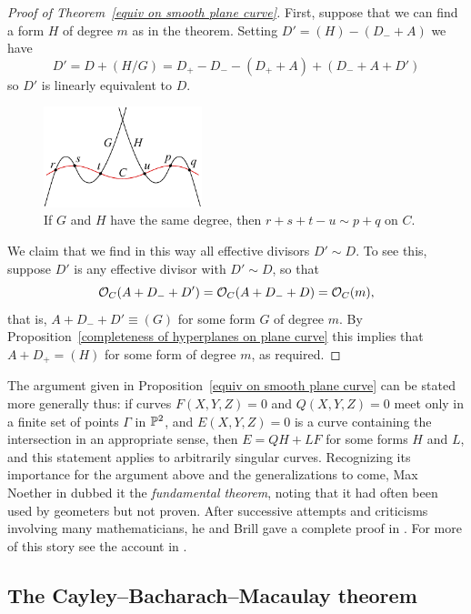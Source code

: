 \begin{proof}[Proof of Theorem~\ref{equiv on smooth plane curve}]
First, suppose that we can find a form $H$ of degree $m$ as in the theorem.
Setting $D' = (H) -(D_{-}+A)$ we have
$$
D' = D + (H/G) = D_{+}- D_{-} - (D_{+}+A)+(D_{-}+A+D')
$$
so $D'$ is linearly equivalent to $D$. 

\begin{figure}
\centerline{\includegraphics[height=1.15in]{"main/Fig14-1"}}
\nointerlineskip
\vskip-15pt
\centerline{\color{white} \vrule width 100pt height 12pt}
\vskip-3pt
\caption{If $G$ and $H$ have the same degree, then $r+s+t-u\sim p+q$ on $C$.}
\label{Fig14.3}
\end{figure}

We claim that we find in this way all effective divisors $D' \sim D$. 
To see this, suppose $D'$ is any effective divisor with $D' \sim D$, so that
$$
{\mathcal O}_C(A+D_{-}+D') = {\mathcal O}_C(A+D_{-}+D)  = {\mathcal O}_C(m),
$$
that is, $A+D_{-}+D' \equiv (G)$ for some form $G$ of degree $m$. By Proposition~\ref{completeness of hyperplanes on plane curve}
this implies that $A+D_{+} = (H)$ for some form of degree $m$, as required.
\end{proof}


The argument given in Proposition~\ref{equiv on smooth plane curve} can be stated more generally thus:  if curves $F(X,Y,Z)=0$ and $Q(X,Y,Z)=0$ 
meet only in a finite set of points $\Gamma$ in $\mathbb P^{2}$, and $E(X,Y,Z) = 0$ is a curve containing the intersection in an appropriate sense,
then $E = QH +LF$ for some forms $H$ and $L$, and this statement
applies to arbitrarily singular curves. Recognizing its importance for
the argument above and the generalizations to come, Max Noether
%
in \cite{Noether1873} dubbed it the \emph{fundamental theorem},
%
noting that it had often been used by geometers but not proven. After successive attempts and 
%
criticisms involving many mathematicians, he and Brill gave a complete proof in \cite{Brill-Noether}. For more of this story see the account in \cite{eisenbud-gray}.

\subsection{The Cayley--Bacharach--Macaulay theorem}\label{CB section}

